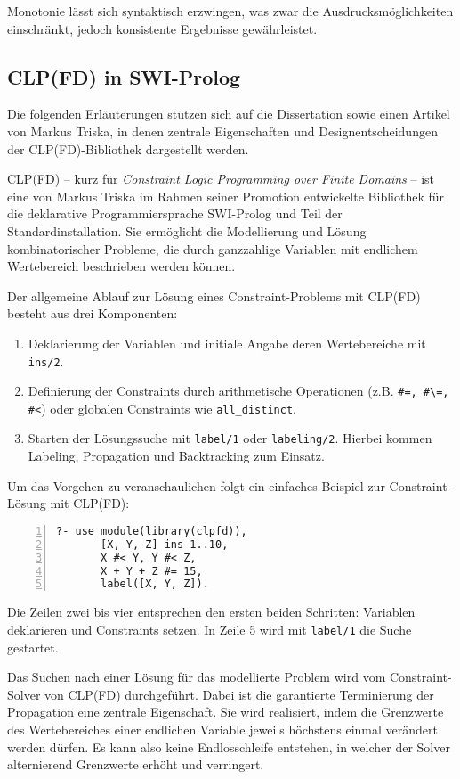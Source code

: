 \documentclass[12pt,a4paper]{article}
\begin{document}
Monotonie lässt sich syntaktisch erzwingen, was zwar die Ausdrucksmöglichkeiten einschränkt, jedoch konsistente Ergebnisse gewährleistet.
\subsection{CLP(FD) in SWI-Prolog}
\label{sec:clpfd}
Die folgenden Erläuterungen stützen sich auf die Dissertation \cite{drt} sowie einen Artikel \cite{clpfd} von Markus Triska, in denen zentrale Eigenschaften und Designentscheidungen der CLP(FD)-Bibliothek dargestellt werden.

CLP(FD) -- kurz für \emph{Constraint Logic Programming over Finite Domains} -- ist eine von Markus Triska im Rahmen seiner Promotion entwickelte Bibliothek für die deklarative Programmiersprache SWI-Prolog und Teil der Standardinstallation. 
Sie ermöglicht die Modellierung und Lösung kombinatorischer Probleme, die durch ganzzahlige Variablen mit endlichem Wertebereich beschrieben werden können.

Der allgemeine Ablauf zur Lösung eines Constraint-Problems mit CLP(FD) besteht aus drei Komponenten:
\begin{enumerate}
    \item Deklarierung der Variablen und initiale Angabe deren Wertebereiche mit \texttt{ins/2}.
    \item Definierung der Constraints durch arithmetische Operationen (z.B. \texttt{\#=, \#\textbackslash=, \#<}) oder globalen Constraints wie \texttt{all\_distinct}.
    \item Starten der Lösungssuche mit \texttt{label/1} oder \texttt{labeling/2}. Hierbei kommen Labeling, Propagation und Backtracking zum Einsatz.
\end{enumerate}

\noindent
Um das Vorgehen zu veranschaulichen folgt ein einfaches Beispiel zur Constraint-Lösung mit CLP(FD):

\begin{Verbatim}[numbers=left, xleftmargin=5mm, frame=lines]
    ?- use_module(library(clpfd)),
       [X, Y, Z] ins 1..10,
       X #< Y, Y #< Z,
       X + Y + Z #= 15,
       label([X, Y, Z]).
\end{Verbatim}

\noindent
Die Zeilen zwei bis vier entsprechen den ersten beiden Schritten: Variablen deklarieren und Constraints setzen.
In Zeile 5 wird mit \texttt{label/1} die Suche gestartet. 

Das Suchen nach einer Lösung für das modellierte Problem wird vom Constraint-Solver von CLP(FD) durchgeführt.
Dabei ist die garantierte Terminierung der Propagation eine zentrale Eigenschaft.
Sie wird realisiert, indem die Grenzwerte des Wertebereiches einer endlichen Variable jeweils höchstens einmal verändert werden dürfen. 
Es kann also keine Endlosschleife entstehen, in welcher der Solver alternierend Grenzwerte erhöht und verringert.
\end{document}
